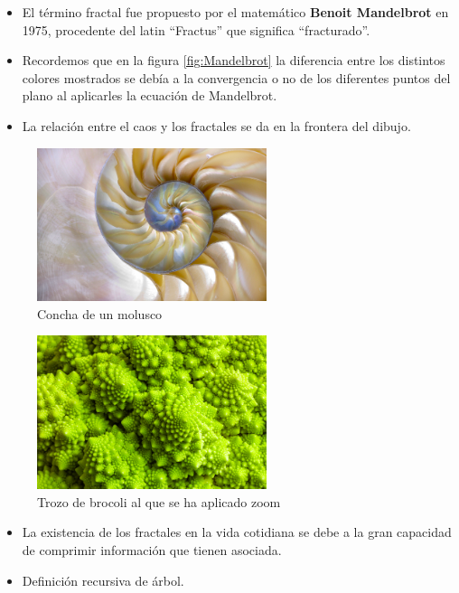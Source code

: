 \documentclass[8pt]{beamer}
\begin{document}
\begin{frame}
\begin{itemize}
\item El término fractal fue propuesto por el matemático \textbf{Benoit Mandelbrot} en 1975, procedente del latin ``Fractus'' que significa ``fracturado''.
\item Recordemos que en la figura \ref{fig:Mandelbrot} la diferencia entre los distintos colores mostrados se debía a la convergencia o no de los diferentes puntos del plano al aplicarles la ecuación de Mandelbrot.
\item La relación entre el caos y los fractales se da en la frontera del dibujo.
\end{itemize}

\begin{minipage}{0.48\textwidth}
\begin{figure}[hbtp]
\centering
\includegraphics[width = 0.6\textwidth]{img/concha.jpg}
\caption{Concha de un molusco}
\label{fig:concha}
\end{figure}
\end{minipage}
\begin{minipage}{0.48\textwidth}
\begin{figure}[hbtp]
\centering
\includegraphics[width = 0.6\textwidth]{img/brocoli.jpg}
\caption{Trozo de brocoli al que se ha aplicado zoom}
\label{fig:brocoli}
\end{figure}
\end{minipage}

\begin{itemize}
\item La existencia de los fractales en la vida cotidiana se debe a la gran capacidad de comprimir información que tienen asociada.
\item Definición recursiva de árbol.
\end{itemize}

\end{frame}
\end{document}
